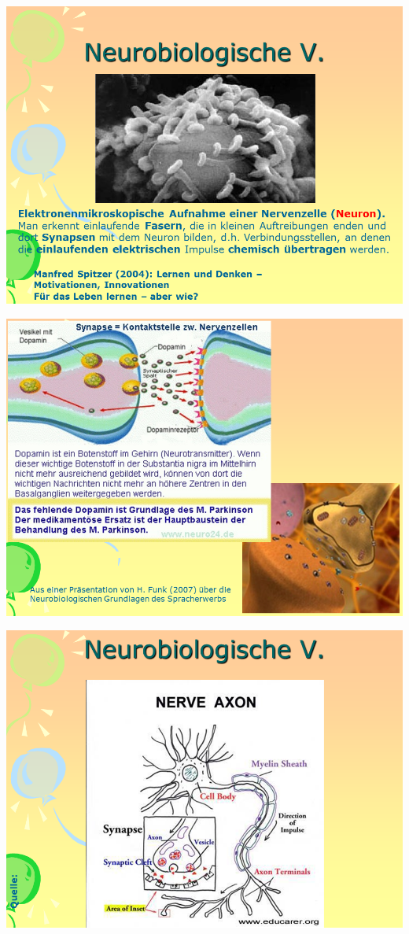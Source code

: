 \documentclass[
  letterpaper,
]{scrbook}
\begin{document}
\includegraphics[width=1\textwidth,height=\textheight]{./pictures/neuro/Diapozitiv20.PNG}

\includegraphics[width=1\textwidth,height=\textheight]{./pictures/neuro/Diapozitiv23.PNG}

\includegraphics[width=1\textwidth,height=\textheight]{./pictures/neuro/Diapozitiv24.PNG}
\end{document}
